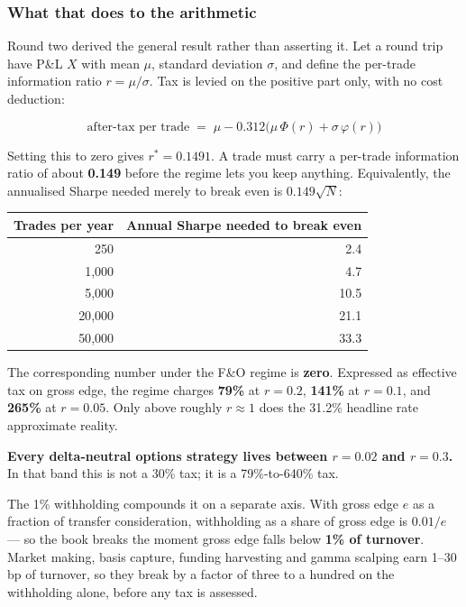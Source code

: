 \documentclass[11pt,a4paper]{article}
\begin{document}
\subsubsection*{What that does to the arithmetic}

Round two derived the general result rather than asserting it. Let a round trip
have P\&L $X$ with mean $\mu$, standard deviation $\sigma$, and define the
per-trade information ratio $r = \mu/\sigma$. Tax is levied on the positive part
only, with no cost deduction:

\[
\text{after-tax per trade} \;=\; \mu - 0.312\big(\mu\,\Phi(r) + \sigma\,\varphi(r)\big)
\]

Setting this to zero gives $r^{*} = 0.1491$. A trade must carry a per-trade
information ratio of about \textbf{0.149} before the regime lets you keep
anything. Equivalently, the annualised Sharpe needed merely to break even is
$0.149\sqrt{N}$:

\begin{center}
\begin{tabular}{@{}rr@{}}
\toprule
Trades per year & Annual Sharpe needed to break even \\
\midrule
250    & 2.4 \\
1{,}000  & 4.7 \\
5{,}000  & 10.5 \\
20{,}000 & 21.1 \\
50{,}000 & 33.3 \\
\bottomrule
\end{tabular}
\end{center}

The corresponding number under the F\&O regime is \textbf{zero}. Expressed as
effective tax on gross edge, the regime charges \textbf{79\%} at $r=0.2$,
\textbf{141\%} at $r=0.1$, and \textbf{265\%} at $r=0.05$. Only above roughly
$r \approx 1$ does the 31.2\% headline rate approximate reality.

\textbf{Every delta-neutral options strategy lives between $r = 0.02$ and
$r = 0.3$.} In that band this is not a 30\% tax; it is a 79\%-to-640\% tax.

The 1\% withholding compounds it on a separate axis. With gross edge $e$ as a
fraction of transfer consideration, withholding as a share of gross edge is
$0.01/e$ --- so the book breaks the moment gross edge falls below \textbf{1\% of
turnover}. Market making, basis capture, funding harvesting and gamma scalping
earn 1--30\,bp of turnover, so they break by a factor of three to a hundred on
the withholding alone, before any tax is assessed.
\end{document}
